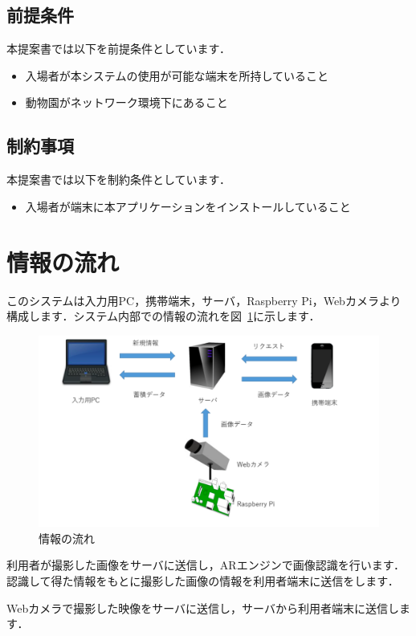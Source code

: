 \documentclass[a4j]{jarticle}
\begin{document}
\subsection{前提条件}
本提案書では以下を前提条件としています．
\begin{itemize}
	\item 入場者が本システムの使用が可能な端末を所持していること
	\item 動物園がネットワーク環境下にあること
\end{itemize}

\subsection{制約事項}
本提案書では以下を制約条件としています．
\begin{itemize}
	\item 入場者が端末に本アプリケーションをインストールしていること
\end{itemize}

\section{情報の流れ}
このシステムは入力用PC，携帯端末，サーバ，Raspberry Pi，Webカメラより構成します．システム内部での情報の流れを図~\ref{data_nagare}に示します．

\begin{figure}[H]
	\begin{center}
		\includegraphics[width=0.8 \linewidth]{data_nagare_3.png}
		\caption{情報の流れ}
		\label{data_nagare}
	\end{center}
\end{figure}

利用者が撮影した画像をサーバに送信し，ARエンジンで画像認識を行います．認識して得た情報をもとに撮影した画像の情報を利用者端末に送信をします．

Webカメラで撮影した映像をサーバに送信し，サーバから利用者端末に送信します．
\end{document}
